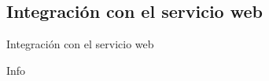 %
%
%

\subsection{Integración con el servicio web}

\begin{frame}{Integración con el servicio web}
  
  Info


\end{frame}
